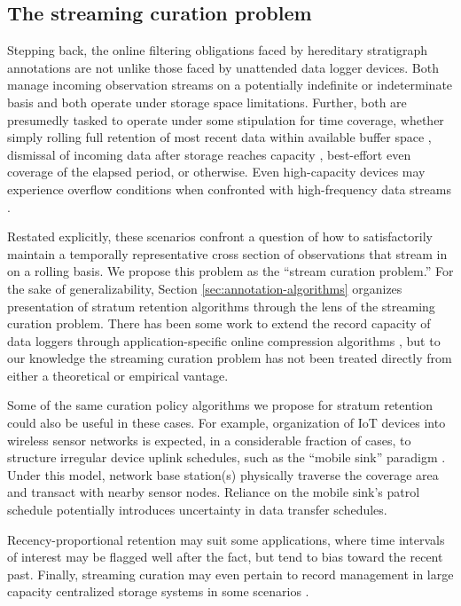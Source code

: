 \subsection{The streaming curation problem}

Stepping back, the online filtering obligations faced by hereditary stratigraph annotations are not unlike those faced by unattended data logger devices.
Both manage incoming observation streams on a potentially indefinite or indeterminate basis and both operate under storage space limitations.
Further, both are presumedly tasked to operate under some stipulation for time coverage, whether simply rolling full retention of most recent data within available buffer space \citep{fincham1995use}, dismissal of incoming data after storage reaches capacity \citep{saunders1989portable,mahzan2017design}, best-effort even coverage of the elapsed period, or otherwise.
Even high-capacity devices may experience overflow conditions when confronted with high-frequency data streams \citep{luharuka2003design}.

Restated explicitly, these scenarios confront a question of how to satisfactorily maintain a temporally representative cross section of observations that stream in on a rolling basis.
We propose this problem as the ``stream curation problem.''
For the sake of generalizability, Section \ref{sec:annotation-algorithms} organizes presentation of stratum retention algorithms through the lens of the streaming curation problem.
There has been some work to extend the record capacity of data loggers through application-specific online compression algorithms \citep{hadiatna2016design}, but to our knowledge the streaming curation problem has not been treated directly from either a theoretical or empirical vantage.


Some of the same curation policy algorithms we propose for stratum retention could also be useful in these cases.
For example, organization of IoT devices into wireless sensor networks is expected, in a considerable fraction of cases, to structure irregular device uplink schedules, such as the ``mobile sink'' paradigm \citep{jain2022survey}.
Under this model, network base station(s) physically traverse the coverage area and transact with nearby sensor nodes.
Reliance on the mobile sink's patrol schedule potentially introduces uncertainty in data transfer schedules.

Recency-proportional retention may suit some applications, where time intervals of interest may be flagged well after the fact, but tend to bias toward the recent past.
Finally, streaming curation may even pertain to record management in large capacity centralized storage systems in some scenarios \citep{bhat2018data}.

